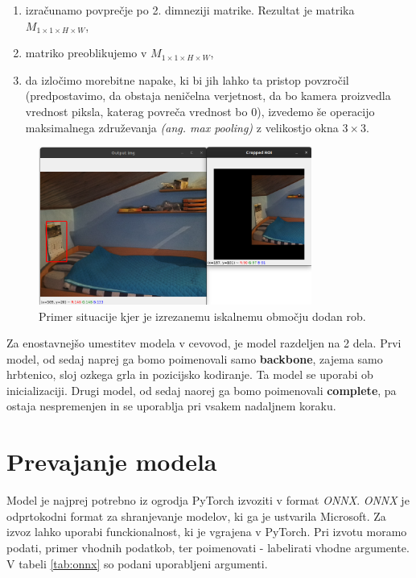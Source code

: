 \documentclass[a4paper,12pt,openright]{book}
\begin{document}
\begin{enumerate}
    \item izračunamo povprečje po 2. dimneziji matrike. Rezultat je matrika $ M_{1 \times 1 \times H \times W} $,
    \item matriko preoblikujemo v $ M_{1 \times 1 \times H \times W} $,
    \item da izločimo morebitne napake, ki bi jih lahko ta pristop povzročil (predpostavimo, da obstaja neničelna verjetnost, da bo kamera proizvedla vrednost piksla, katerag povreča vrednost bo 0), izvedemo še operacijo maksimalnega združevanja \emph{(ang. max pooling)} z velikostjo okna $ 3 \times 3 $.
\end{enumerate}

\begin{figure}[htb]
    \begin{center}
        \includegraphics[width=0.8\textwidth]{img/example_mask.png}
    \end{center}
    \caption{Primer situacije kjer je izrezanemu iskalnemu območju dodan rob.}
    \label{img:mask}
\end{figure}

Za enostavnejšo umestitev modela v cevovod, je model razdeljen na 2 dela. Prvi model, od sedaj naprej ga bomo poimenovali samo \textbf{backbone}, zajema samo hrbtenico, sloj ozkega grla in pozicijsko kodiranje. Ta model se uporabi ob inicializaciji. Drugi model, od sedaj naorej ga bomo poimenovali \textbf{complete}, pa ostaja nespremenjen in se uporablja pri vsakem nadaljnem koraku.

\section{Prevajanje modela}
Model je najprej potrebno iz ogrodja PyTorch izvoziti v format \emph{ONNX}. \emph{ONNX} je odprtokodni format za shranjevanje modelov, ki ga je ustvarila Microsoft. Za izvoz lahko uporabi funckionalnost, ki je vgrajena v PyTorch. Pri izvotu moramo podati, primer vhodnih podatkob, ter poimenovati - labelirati vhodne argumente. V tabeli \ref{tab:onnx} so podani uporabljeni argumenti.
\end{document}

